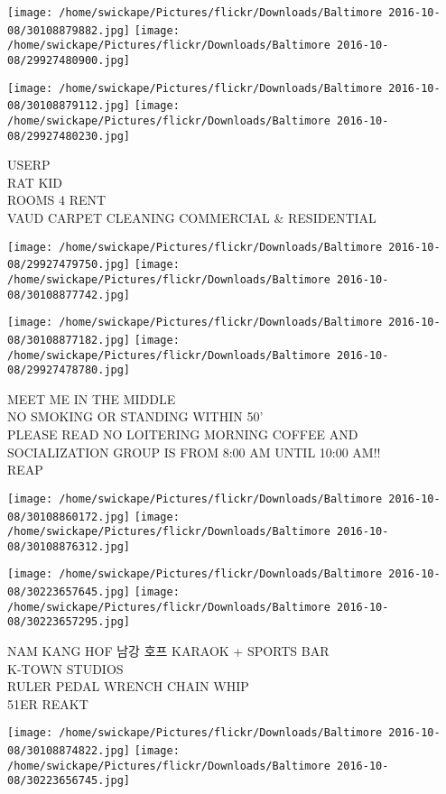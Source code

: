 \documentclass[10pt,letterpaper]{article}
\begin{document}
\texttt{[image: /home/swickape/Pictures/flickr/Downloads/Baltimore 2016-10-08/30108879882.jpg]}
\texttt{[image: /home/swickape/Pictures/flickr/Downloads/Baltimore 2016-10-08/29927480900.jpg]}

\texttt{[image: /home/swickape/Pictures/flickr/Downloads/Baltimore 2016-10-08/30108879112.jpg]}
\texttt{[image: /home/swickape/Pictures/flickr/Downloads/Baltimore 2016-10-08/29927480230.jpg]}

USERP\\
RAT KID\\
ROOMS 4 RENT\\
VAUD CARPET CLEANING COMMERCIAL \& RESIDENTIAL
\pagebreak

\texttt{[image: /home/swickape/Pictures/flickr/Downloads/Baltimore 2016-10-08/29927479750.jpg]}
\texttt{[image: /home/swickape/Pictures/flickr/Downloads/Baltimore 2016-10-08/30108877742.jpg]}

\texttt{[image: /home/swickape/Pictures/flickr/Downloads/Baltimore 2016-10-08/30108877182.jpg]}
\texttt{[image: /home/swickape/Pictures/flickr/Downloads/Baltimore 2016-10-08/29927478780.jpg]}

MEET ME IN THE MIDDLE\\
NO SMOKING OR STANDING WITHIN 50'\\
PLEASE READ NO LOITERING MORNING COFFEE AND SOCIALIZATION GROUP IS FROM 8:00 AM UNTIL 10:00 AM!!\\
REAP
\pagebreak

\texttt{[image: /home/swickape/Pictures/flickr/Downloads/Baltimore 2016-10-08/30108860172.jpg]}
\texttt{[image: /home/swickape/Pictures/flickr/Downloads/Baltimore 2016-10-08/30108876312.jpg]}

\texttt{[image: /home/swickape/Pictures/flickr/Downloads/Baltimore 2016-10-08/30223657645.jpg]}
\texttt{[image: /home/swickape/Pictures/flickr/Downloads/Baltimore 2016-10-08/30223657295.jpg]}

NAM KANG HOF 남강 호프 KARAOK + SPORTS BAR\\
K{-}TOWN STUDIOS\\
RULER PEDAL WRENCH CHAIN WHIP\\
51ER REAKT
\pagebreak

\texttt{[image: /home/swickape/Pictures/flickr/Downloads/Baltimore 2016-10-08/30108874822.jpg]}
\texttt{[image: /home/swickape/Pictures/flickr/Downloads/Baltimore 2016-10-08/30223656745.jpg]}
\end{document}

